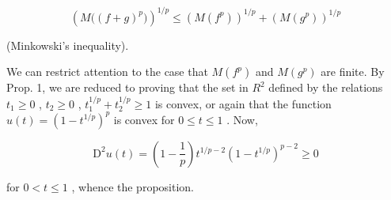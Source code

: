\[
\left(M \big ((f + g) ^ {p} \big)\right) ^ {1 / p} \leqslant \left(M (f ^ {p})\right) ^ {1 / p} + \left(M (g ^ {p})\right) ^ {1 / p}\tag{7}
\]

(Minkowski's inequality).

We can restrict attention to the case that \(M(f^{p})\) and \(M(g^{p})\) are finite. By Prop. 1, we are reduced to proving that the set in \(R^{2}\) defined by the relations \(t_{1} \geqslant 0\) , \(t_{2} \geqslant 0\) , \(t_{1}^{1/p} + t_{2}^{1/p} \geqslant 1\) is convex, or again that the function \(u(t) = (1 - t^{1/p})^{p}\) is convex for \(0 \leqslant t \leqslant 1\) . Now,

\[
\mathrm{D} ^ {2} u (t) = \left(1 - \frac {1}{p}\right) t ^ {1 / p - 2} (1 - t ^ {1 / p}) ^ {p - 2} \geqslant 0
\]

for \(0 < t \leqslant 1\) , whence the proposition.

